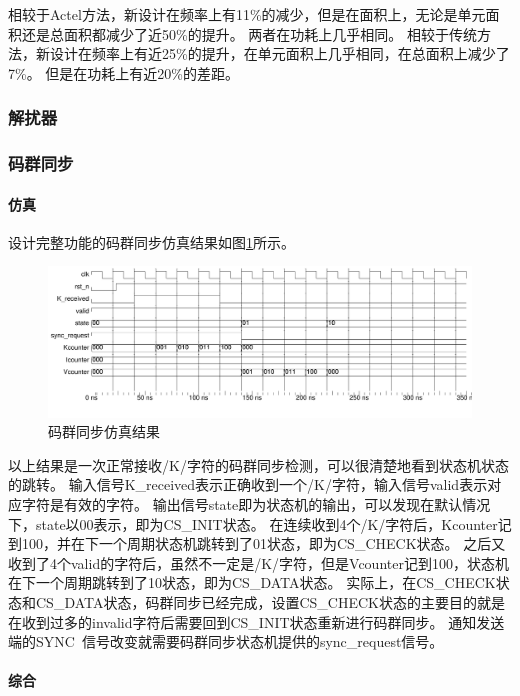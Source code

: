 \documentclass[UTF8]{ctexart}
\begin{document}
相较于Actel方法，新设计在频率上有11\%的减少，但是在面积上，无论是单元面积还是总面积都减少了近50\%的提升。
两者在功耗上几乎相同。
相较于传统方法，新设计在频率上有近25\%的提升，在单元面积上几乎相同，在总面积上减少了7\%。
但是在功耗上有近20\%的差距。


\subsubsection{解扰器}

\subsubsection{码群同步}

\paragraph{仿真}

设计完整功能的码群同步仿真结果如图\ref{fig:cgs_detection_wave}所示。

\begin{figure}[H]
	\centering
	\includegraphics[width=18cm]{./img/cgs_detection_wave.pdf}
	\caption{码群同步仿真结果}
	\label{fig:cgs_detection_wave}
\end{figure}

以上结果是一次正常接收/K/字符的码群同步检测，可以很清楚地看到状态机状态的跳转。
输入信号K\_received表示正确收到一个/K/字符，输入信号valid表示对应字符是有效的字符。
输出信号state即为状态机的输出，可以发现在默认情况下，state以00表示，即为CS\_INIT状态。
在连续收到4个/K/字符后，Kcounter记到100，并在下一个周期状态机跳转到了01状态，即为CS\_CHECK状态。
之后又收到了4个valid的字符后，虽然不一定是/K/字符，但是Vcounter记到100，状态机在下一个周期跳转到了10状态，即为CS\_DATA状态。
实际上，在CS\_CHECK状态和CS\_DATA状态，码群同步已经完成，设置CS\_CHECK状态的主要目的就是在收到过多的invalid字符后需要回到CS\_INIT状态重新进行码群同步。
通知发送端的SYNC~信号改变就需要码群同步状态机提供的sync\_request信号。

\paragraph{综合}
\end{document}
